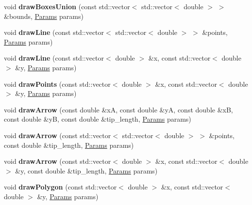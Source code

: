 \begin{DoxyCompactItemize}
\item 
\mbox{\label{namespacevibes_a90c2a46cd1f564a390ed2a3b1f095117}} 
void {\bfseries draw\+Boxes\+Union} (const std\+::vector$<$ std\+::vector$<$ double $>$ $>$ \&bounds, \hyperlink{classvibes_1_1_params}{Params} params)
\item 
\mbox{\label{namespacevibes_a1244d0b0da6213530f42134f65bf9d23}} 
void {\bfseries draw\+Line} (const std\+::vector$<$ std\+::vector$<$ double $>$ $>$ \&points, \hyperlink{classvibes_1_1_params}{Params} params)
\item 
\mbox{\label{namespacevibes_a6487ec00eafeb2f33cebe28be6c8660f}} 
void {\bfseries draw\+Line} (const std\+::vector$<$ double $>$ \&x, const std\+::vector$<$ double $>$ \&y, \hyperlink{classvibes_1_1_params}{Params} params)
\item 
\mbox{\label{namespacevibes_aee9a745d10c6a2afa19f1d2d8cdf67d6}} 
void {\bfseries draw\+Points} (const std\+::vector$<$ double $>$ \&x, const std\+::vector$<$ double $>$ \&y, \hyperlink{classvibes_1_1_params}{Params} params)
\item 
\mbox{\label{namespacevibes_ac97ced803ebe4ba273271c18488054a7}} 
void {\bfseries draw\+Arrow} (const double \&xA, const double \&yA, const double \&xB, const double \&yB, const double \&tip\+\_\+length, \hyperlink{classvibes_1_1_params}{Params} params)
\item 
\mbox{\label{namespacevibes_a69097a3c9eb2e178666ad55ee82b42da}} 
void {\bfseries draw\+Arrow} (const std\+::vector$<$ std\+::vector$<$ double $>$ $>$ \&points, const double \&tip\+\_\+length, \hyperlink{classvibes_1_1_params}{Params} params)
\item 
\mbox{\label{namespacevibes_a9f82b69896e5c3aedd36b04a4b16f365}} 
void {\bfseries draw\+Arrow} (const std\+::vector$<$ double $>$ \&x, const std\+::vector$<$ double $>$ \&y, const double \&tip\+\_\+length, \hyperlink{classvibes_1_1_params}{Params} params)
\item 
\mbox{\label{namespacevibes_a0935e6fc500d90394f3b1608faf7b655}} 
void {\bfseries draw\+Polygon} (const std\+::vector$<$ double $>$ \&x, const std\+::vector$<$ double $>$ \&y, \hyperlink{classvibes_1_1_params}{Params} params)

\end{DoxyCompactItemize}
